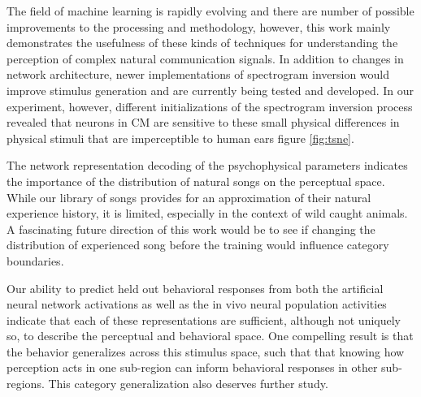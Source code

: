 
The field of machine learning is rapidly evolving and there are number of possible improvements to the processing and methodology, however, this work mainly demonstrates the usefulness of these kinds of techniques for understanding the perception of complex natural communication signals. In addition to changes in network architecture, newer implementations of spectrogram inversion would improve stimulus generation and are currently being tested and developed. In our experiment, however, different initializations of the spectrogram inversion process revealed that neurons in \ac{CM} are sensitive to these small physical differences in physical stimuli that are imperceptible to human ears figure \ref{fig:tsne}.


The network representation decoding of the psychophysical parameters indicates the importance of the distribution of natural songs on the perceptual space. While our library of songs provides for an approximation of their natural experience history, it is limited, especially in the context of wild caught animals. A fascinating future direction of this work would be to see if changing the distribution of experienced song before the training would influence category boundaries.

Our ability to predict held out behavioral responses from both the artificial neural network activations as well as the in vivo neural population activities indicate that each of these representations are sufficient, although not uniquely so, to describe the perceptual and behavioral space. One compelling result is that the behavior generalizes across this stimulus space, such that that knowing how perception acts in one sub-region can inform behavioral responses in other sub-regions. This category generalization also deserves further study.


